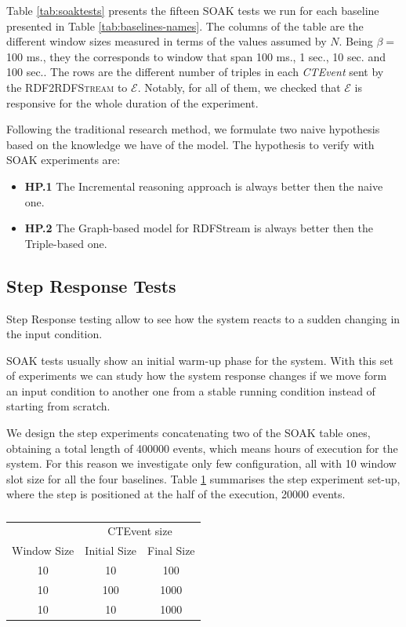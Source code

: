 Table \ref{tab:soaktests} presents the fifteen SOAK tests we run for each baseline presented in Table \ref{tab:baselines-names}. The columns of the table are the different window sizes measured in terms of the values assumed by $N$.  Being $\beta=$ 100 ms., they the corresponds to window that span 100 ms., 1 sec., 10 sec. and 100 sec.. The rows are the different number of triples in each \textit{CTEvent} sent by the \textsc{RDF2RDFStream} to $\mathcal{E}$. Notably, for all of them, we checked that $\mathcal{E}$ is responsive for the whole duration of the experiment. 

\pagebreak

Following the traditional research method, we formulate two naive hypothesis based on the knowledge we have of the model. The hypothesis to verify with SOAK experiments are:
\begin{itemize}
\item \textbf{HP.1} The Incremental reasoning approach is always better then the naive one.
\item \textbf{HP.2} The Graph-based model for RDFStream is always better then the Triple-based one.
\end{itemize}

\subsection{Step Response Tests}\label{sec:step-es}

Step Response testing allow to see how the system reacts to a sudden changing in the input condition. 

SOAK tests usually show an initial warm-up phase for the system. With this set of experiments we can study how the system response changes if we move form an input condition to another one from a stable running condition instead of starting from scratch.

We design the step experiments concatenating two of the SOAK table ones, obtaining a total length of 400000 events, which means hours of execution for the system. For this reason we investigate only few configuration, all with 10  window slot size for all the four baselines. Table \ref{tab:steptests} summarises the step experiment set-up, where the step is positioned at the half of the execution, 20000 events.
\begin{table}[htb]
\centering
 \begin{tabular}{c|c|c}
	  	\hline
	  	&\multicolumn{2}{c}{CTEvent size}  \\
		Window Size & Initial Size & Final Size\\
		\hline
		\hline
		 10 & 10 & 100\\
		  10 & 100 & 1000\\
		 10 & 10 & 1000\\
		
		\hline 
 \end{tabular}
	\vspace{10pt}
 \caption{}
\label{tab:steptests}
\end{table}

